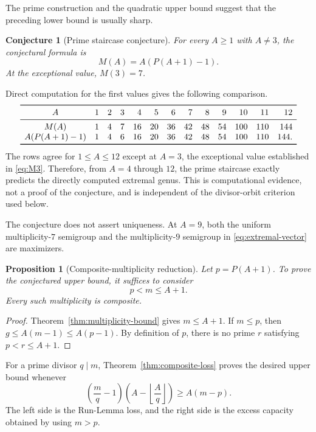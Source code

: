 \documentclass[11pt]{article}
\theoremstyle{plain}
\newtheorem{proposition}[theorem]{Proposition}
\newtheorem{conjecture}[theorem]{Conjecture}
\theoremstyle{definition}
\theoremstyle{remark}
\begin{document}
The prime construction and the quadratic upper bound suggest that the
preceding lower bound is usually sharp.

\begin{conjecture}[Prime staircase conjecture]
\label{conj:prime-staircase}
For every $A\geq1$ with $A\neq 3$, the conjectural formula is
\[
  \boxed{M(A)=A(P(A+1)-1).}
\]
At the exceptional value, $M(3)=7$.
\end{conjecture}

Direct computation for the first values gives the following comparison.
\begingroup
\small
\[
\begin{array}{c*{12}{r}}
 \toprule
 A&1&2&3&4&5&6&7&8&9&10&11&12\\
 \midrule
 M(A)&1&4&7&16&20&36&42&48&54&100&110&144\\
 A(P(A+1)-1)&1&4&6&16&20&36&42&48&54&100&110&144.\\
 \bottomrule
\end{array}
\]
\endgroup
The rows agree for $1\leq A\leq12$ except at $A=3$, the exceptional value
established in \eqref{eq:M3}.  Therefore, from $A=4$ through $12$, the prime
staircase exactly predicts the directly computed extremal genus.  This is
computational evidence, not a proof of the conjecture, and is independent of
the divisor-orbit criterion used below.

The conjecture does not assert uniqueness.  At $A=9$, both the uniform
multiplicity-$7$ semigroup and the multiplicity-$9$ semigroup in
\eqref{eq:extremal-vector} are maximizers.

\begin{proposition}[Composite-multiplicity reduction]
\label{prop:composite-reduction}
Let $p=P(A+1)$.  To prove the conjectured upper bound, it suffices to consider
\[
  \boxed{p<m\leq A+1.}
\]
Every such multiplicity is composite.
\end{proposition}

\begin{proof}
Theorem~\ref{thm:multiplicity-bound} gives $m\leq A+1$.  If $m\leq p$, then
$g\leq A(m-1)\leq A(p-1)$.  By definition of $p$, there is no prime $r$
satisfying $p<r\leq A+1$.
\end{proof}

For a prime divisor $q\mid m$, Theorem~\ref{thm:composite-loss} proves the
desired upper bound whenever
\begin{equation}\label{eq:loss-versus-capacity}
  \left(\frac mq-1\right)
  \left(A-\left\lfloor\frac Aq\right\rfloor\right)
  \geq A(m-p).
\end{equation}
The left side is the Run-Lemma loss, and the right side is the excess capacity
obtained by using $m>p$.
\end{document}
